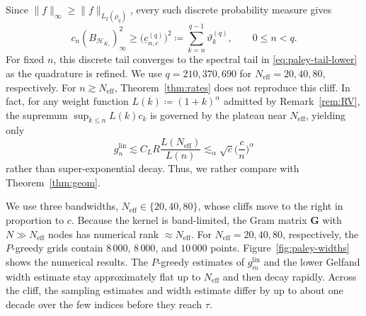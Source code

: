 \documentclass[11pt,reqno, a4paper]{article}
\numberwithin{equation}{section}
\newcommand{\lin}{\ensuremath{\mathrm{lin}}}
\begin{document}
Since $\|f\|_\infty\geq\|f\|_{L_2(\rho_q)}$, every such discrete
probability measure gives
\begin{equation}\label{eq:paley-discrete-lower}
c_n(B_{\mathcal H_{K_c}})_\infty^2
\geq
\bigl(\underline c_{n,c}^{(q)}\bigr)^2
\coloneqq
\sum_{k=n}^{q-1}\vartheta_k^{(q)},
\qquad 0\leq n<q.
\end{equation}
For fixed $n$, this discrete tail converges to the spectral tail in \eqref{eq:paley-tail-lower} as the quadrature is refined.
We use $q=210,370,690$ for $N_{\mathrm{eff}}=20,40,80$, respectively.
For $n\gtrsim N_{\mathrm{eff}}$, Theorem~\ref{thm:rates} does not reproduce this cliff.
In fact, for any weight function $L(k) \coloneqq (1+k)^{\alpha}$ admitted by Remark~\ref{rem:RV}, the supremum $\sup_{k\le n}L(k)c_k$ is governed by the plateau near $N_{\mathrm{eff}}$, 
yielding only
\begin{equation}
    g_n^{\lin}\lesssim 
C_L R \frac{L(N_{\mathrm{eff}})}{L(n)}\lesssim_\alpha \sqrt{c}\Big(\frac{c}{n}\Big)^{\alpha} 
\end{equation}
rather than super-exponential decay. 
Thus, we rather compare with Theorem~\ref{thm:geom}. 

We use three bandwidths, $N_{\mathrm{eff}}\in\{20,40,80\}$, whose cliffs move to the right in proportion to $c$. Because the kernel is band-limited, the Gram matrix $\mathbf G$ with $N\gg N_{\mathrm{eff}}$ nodes has numerical rank
$\approx N_{\mathrm{eff}}$.
For $N_{\mathrm{eff}}=20,40,80$, respectively, the $P$-greedy grids contain $8\,000$, $8\,000$, and $10\,000$ points.
Figure~\ref{fig:paley-widths} shows the numerical results.
The $P$-greedy estimates of $g_m^{\lin}$ and the lower Gelfand width estimate stay approximately flat up to $N_{\mathrm{eff}}$ and then decay rapidly.
Across the cliff, the sampling estimates and width estimate differ by up to about one decade over the few indices before they reach $\tau$.
\end{document}
